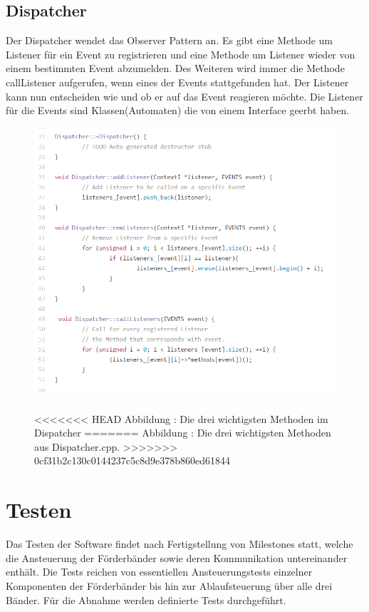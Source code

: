 \documentclass[a4paper, 11pt]{article}
\begin{document}
\newpage

\subsection{Dispatcher}
Der Dispatcher wendet das Observer Pattern an. Es gibt eine Methode um Listener für ein Event zu registrieren und eine Methode um Listener wieder von einem bestimmten Event abzumelden. Des Weiteren wird immer die Methode callListener aufgerufen, wenn eines der Events stattgefunden hat. Der Listener kann nun entscheiden wie und ob er auf das Event reagieren möchte. Die Listener für die Events sind Klassen(Automaten) die von einem Interface geerbt haben.

\begin{figure}[H]
\centering 
    \includegraphics[scale=0.7]{ISR/dispatcher.png}
    
<<<<<<< HEAD
    \small Abbildung \theimgcounter : Die drei wichtigsten Methoden im Dispatcher
=======
    \small Abbildung \theimgcounter : Die drei wichtigsten Methoden aus Dispatcher.cpp.
>>>>>>> 0cf31b2c130c0144237c5c8d9e378b860ed61844
    \label{dispatcher}
\end{figure}

\newpage

\section{Testen}
Das Testen der Software findet nach Fertigstellung von Milestones statt, welche die Ansteuerung der Förderbänder sowie deren Kommunikation untereinander enthält. Die Tests reichen von essentiellen Ansteuerungstests einzelner Komponenten der Förderbänder bis hin zur Ablaufsteuerung über alle drei Bänder. Für die Abnahme werden definierte Tests durchgeführt.
\end{document}
